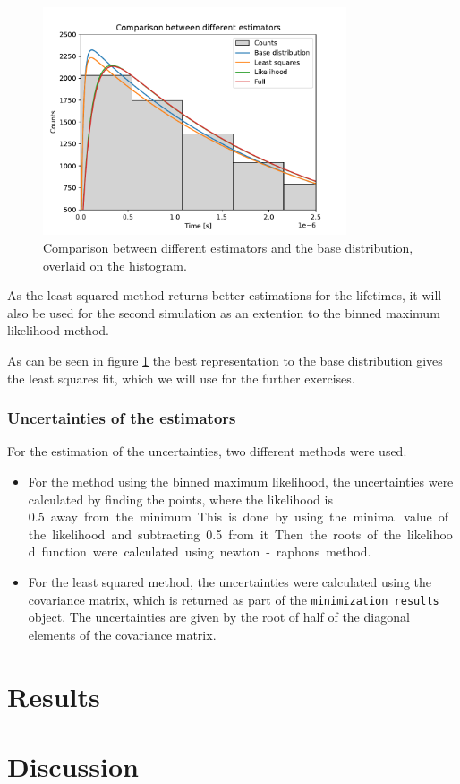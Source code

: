 \documentclass[11pt, a4paper, oneside]{book}
\newcommand\Plotwidth{0.8}
\begin{document}
\begin{figure}[H]
    \centering
    \includegraphics[width=\Plotwidth\textwidth]{images/comparison_estimators.pdf}
    \caption{Comparison between different estimators and the base distribution, overlaid on the histogram.}
    \label{fig:comparison_estimators}
\end{figure}

As the least squared method returns better estimations for the lifetimes, it will also be used for the second simulation as an extention to the binned maximum likelihood method.

As can be seen in figure \ref{fig:comparison_estimators} the best representation to the base distribution gives the least squares fit, which we will use for the further exercises.

\subsection{Uncertainties of the estimators}
For the estimation of the uncertainties, two different methods were used. 
\begin{itemize}
    \item For the method using the binned maximum likelihood, the uncertainties were calculated by finding the points, where the likelihood is \qty{0.5} away from the minimum. This is done by using the minimal value of the likelihood and subtracting \qty{0.5} from it. Then the roots of the likelihood function were calculated using newton-raphons method. 
    \item For the least squared method, the uncertainties were calculated using the covariance matrix, which is returned as part of the \lstinline{minimization_results} object. The uncertainties are given by the root of half of the diagonal elements of the covariance matrix.
\end{itemize}


\chapter{Results}

\chapter{Discussion}


\end{document}
